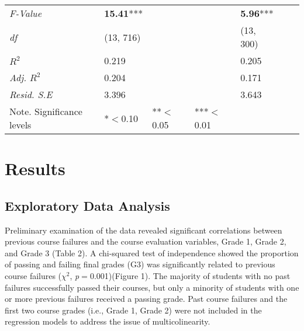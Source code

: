 \documentclass[sigconf]{acmart}
\begin{document}
\begin{table*}[ht]
\begin{tabular}{lllllll}
    \textit{F-Value}    & \textbf{15.41}***  &       &        & \textbf{5.96}***    &       &       \\
    \textit{df}         &   (13, 716)        &       &        &      (13, 300)      &       &       \\
    \textit{$R^2$}      &      0.219         &       &        &         0.205       &       &       \\ 
    \textit{Adj. $R^2$} &      0.204         &       &        &         0.171       &       &       \\
    \textit{Resid. S.E} &      3.396         &       &        &         3.643       &       &       \\
    \bottomrule
    Note. Significance levels & *$<$0.10      & **$<$0.05  & ***$<$0.01 & & &
  \end{tabular}
\end{table*}


\section{Results}

\subsection{Exploratory Data Analysis}

Preliminary examination of the data revealed significant correlations 
between previous course failures and the course evaluation variables,
Grade 1, Grade 2, and Grade 3 (Table 2). A chi-squared test of independence 
showed the proportion of passing and failing final grades (G3) was 
significantly related to previous course failures ($\chi^2$,
\textit{p}$=$0.001)(Figure 1). The majority of students with no past failures 
successfully passed their courses, but only a minority of students with one
or more previous failures received a passing grade. Past course failures 
and the first two course grades (i.e., Grade 1, Grade 2) were not included 
in the regression models to address the issue of multicolinearity.

\end{document}
